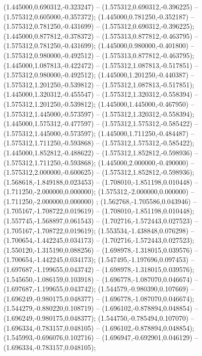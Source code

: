  (1.445000,0.690312,-0.323247) -- (1.575312,0.690312,-0.396225) -- (1.575312,0.605000,-0.357372);
 (1.445000,0.781250,-0.352187) -- (1.575312,0.781250,-0.431699) -- (1.575312,0.690312,-0.396225);
 (1.445000,0.877812,-0.378372) -- (1.575313,0.877812,-0.463795) -- (1.575312,0.781250,-0.431699);
 (1.445000,0.980000,-0.401800) -- (1.575312,0.980000,-0.492512) -- (1.575313,0.877812,-0.463795);
 (1.445000,1.087813,-0.422472) -- (1.575312,1.087813,-0.517851) -- (1.575312,0.980000,-0.492512);
 (1.445000,1.201250,-0.440387) -- (1.575312,1.201250,-0.539812) -- (1.575312,1.087813,-0.517851);
 (1.445000,1.320312,-0.455547) -- (1.575312,1.320312,-0.558394) -- (1.575312,1.201250,-0.539812);
 (1.445000,1.445000,-0.467950) -- (1.575312,1.445000,-0.573597) -- (1.575312,1.320312,-0.558394);
 (1.445000,1.575312,-0.477597) -- (1.575312,1.575312,-0.585422) -- (1.575312,1.445000,-0.573597);
 (1.445000,1.711250,-0.484487) -- (1.575312,1.711250,-0.593868) -- (1.575312,1.575312,-0.585422);
 (1.445000,1.852812,-0.488622) -- (1.575312,1.852812,-0.598936) -- (1.575312,1.711250,-0.593868);
 (1.445000,2.000000,-0.490000) -- (1.575312,2.000000,-0.600625) -- (1.575312,1.852812,-0.598936);
 (1.568618,-1.849188,0.023453) -- (1.708010,-1.851198,0.010448) -- (1.711250,-2.000000,0.000000);
 (1.575312,-2.000000,0.000000) -- (1.711250,-2.000000,0.000000) ;
 (1.562768,-1.705586,0.043946) -- (1.705167,-1.708722,0.019619) -- (1.708010,-1.851198,0.010448);
 (1.557745,-1.568897,0.061543) -- (1.702716,-1.572443,0.027523) -- (1.705167,-1.708722,0.019619);
 (1.553534,-1.438848,0.076298) -- (1.700654,-1.442245,0.034173) -- (1.702716,-1.572443,0.027523);
 (1.550120,-1.315190,0.088256) -- (1.698978,-1.318015,0.039576) -- (1.700654,-1.442245,0.034173);
 (1.547495,-1.197696,0.097453) -- (1.697687,-1.199655,0.043742) -- (1.698978,-1.318015,0.039576);
 (1.545650,-1.086159,0.103918) -- (1.696778,-1.087070,0.046674) -- (1.697687,-1.199655,0.043742);
 (1.544579,-0.980390,0.107669) -- (1.696249,-0.980175,0.048377) -- (1.696778,-1.087070,0.046674);
 (1.544279,-0.880220,0.108719) -- (1.696102,-0.878894,0.048854) -- (1.696249,-0.980175,0.048377);
 (1.544750,-0.785494,0.107070) -- (1.696334,-0.783157,0.048105) -- (1.696102,-0.878894,0.048854);
 (1.545993,-0.696076,0.102716) -- (1.696947,-0.692901,0.046129) -- (1.696334,-0.783157,0.048105);
